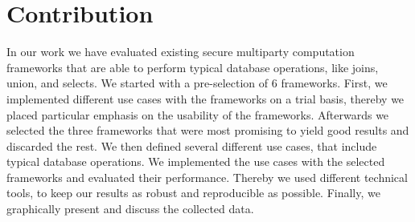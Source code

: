 \section{Contribution}
In our work we have evaluated existing secure multiparty computation frameworks that are able to perform typical database operations, like joins, union, and selects. We started with a pre-selection of 6 frameworks. First, we implemented different use cases with the frameworks on a trial basis, thereby we placed particular emphasis on the usability of the frameworks. Afterwards we selected the three frameworks that were most promising to yield good results and discarded the rest. We then defined several different use cases, that include typical database operations. We implemented the use cases with the selected frameworks and evaluated their performance. Thereby we used different technical tools, to keep our results as robust and reproducible as possible. Finally, we graphically present and discuss the collected data. 

